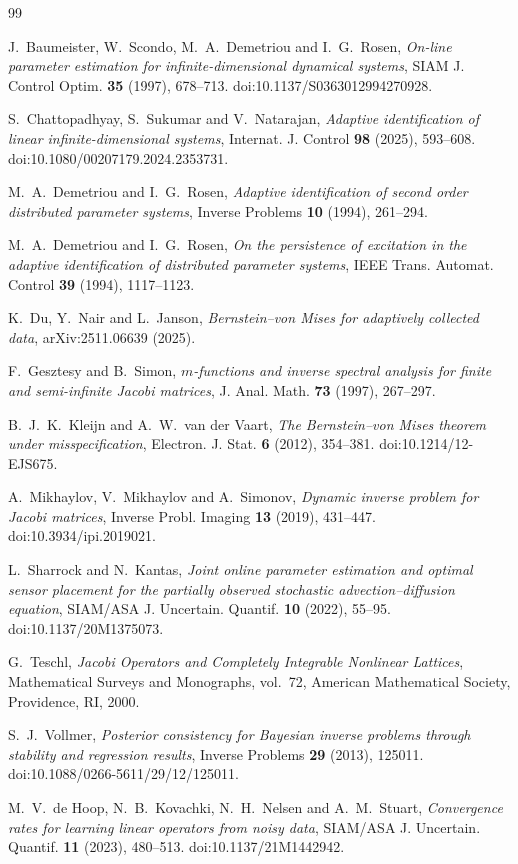 
\begin{thebibliography}{99}

J.~Baumeister, W.~Scondo, M.~A.~Demetriou and I.~G.~Rosen,
\emph{On-line parameter estimation for infinite-dimensional dynamical
systems},
SIAM J. Control Optim. \textbf{35} (1997), 678--713.
doi:10.1137/S0363012994270928.

S.~Chattopadhyay, S.~Sukumar and V.~Natarajan,
\emph{Adaptive identification of linear infinite-dimensional systems},
Internat. J. Control \textbf{98} (2025), 593--608.
doi:10.1080/00207179.2024.2353731.

M.~A.~Demetriou and I.~G.~Rosen,
\emph{Adaptive identification of second order distributed parameter
systems},
Inverse Problems \textbf{10} (1994), 261--294.

M.~A.~Demetriou and I.~G.~Rosen,
\emph{On the persistence of excitation in the adaptive identification of
distributed parameter systems},
IEEE Trans. Automat. Control \textbf{39} (1994), 1117--1123.

K.~Du, Y.~Nair and L.~Janson,
\emph{Bernstein--von Mises for adaptively collected data},
arXiv:2511.06639 (2025).

F.~Gesztesy and B.~Simon,
\emph{\(m\)-functions and inverse spectral analysis for finite and
semi-infinite Jacobi matrices},
J. Anal. Math. \textbf{73} (1997), 267--297.

B.~J.~K.~Kleijn and A.~W.~van der Vaart,
\emph{The Bernstein--von Mises theorem under misspecification},
Electron. J. Stat. \textbf{6} (2012), 354--381.
doi:10.1214/12-EJS675.

A.~Mikhaylov, V.~Mikhaylov and A.~Simonov,
\emph{Dynamic inverse problem for Jacobi matrices},
Inverse Probl. Imaging \textbf{13} (2019), 431--447.
doi:10.3934/ipi.2019021.

L.~Sharrock and N.~Kantas,
\emph{Joint online parameter estimation and optimal sensor placement for the
partially observed stochastic advection--diffusion equation},
SIAM/ASA J. Uncertain. Quantif. \textbf{10} (2022), 55--95.
doi:10.1137/20M1375073.

G.~Teschl,
\emph{Jacobi Operators and Completely Integrable Nonlinear Lattices},
Mathematical Surveys and Monographs, vol.~72,
American Mathematical Society, Providence, RI, 2000.


S.~J.~Vollmer,
\emph{Posterior consistency for Bayesian inverse problems through stability
and regression results},
Inverse Problems \textbf{29} (2013), 125011.
doi:10.1088/0266-5611/29/12/125011.

M.~V.~de Hoop, N.~B.~Kovachki, N.~H.~Nelsen and A.~M.~Stuart,
\emph{Convergence rates for learning linear operators from noisy data},
SIAM/ASA J. Uncertain. Quantif. \textbf{11} (2023), 480--513.
doi:10.1137/21M1442942.

\end{thebibliography}
